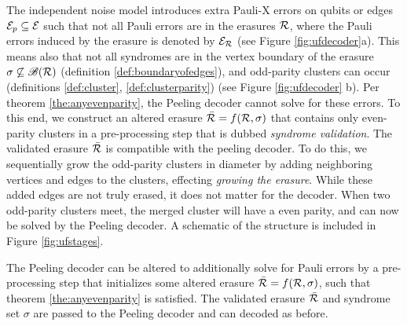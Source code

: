 The independent noise model introduces extra Pauli-X errors on qubits or edges $\mathcal{E}_p\subseteq \mathcal{E}$ such that not all Pauli errors are in the erasures $\mathcal{R}$, where the Pauli errors induced by the erasure is denoted by $\mathcal{E}_{\mathcal{R}}$ (see Figure \ref{fig:ufdecoder}a). This means also that not all syndromes are in the vertex boundary of the erasure $\sigma \not\subseteq \mathscr{B}(\mathcal{R})$ (definition \ref{def:boundaryofedges}), and odd-parity clusters can occur (definitions \ref{def:cluster}, \ref{def:clusterparity}) (see Figure \ref{fig:ufdecoder} b). Per theorem \ref{the:anyevenparity}, the Peeling decoder cannot solve for these errors. To this end, we construct an altered erasure $\bar{\mathcal{R}} = f(\mathcal{R},\sigma)$ that contains only even-parity clusters in a pre-processing step that is dubbed \emph{syndrome validation}. The validated erasure $\bar{\mathcal{R}}$ is compatible with the peeling decoder. To do this, we sequentially grow the odd-parity clusters in diameter by adding neighboring vertices and edges to the clusters, effecting \emph{growing the erasure}. While these added edges are not truly erased, it does not matter for the decoder. When two odd-parity clusters meet, the merged cluster will have a even parity, and can now be solved by the Peeling decoder. A schematic of the structure is included in Figure \ref{fig:ufstages}.
\begin{proposition}\label{prop:ufdecoder}
  The Peeling decoder can be altered to additionally solve for Pauli errors by a pre-processing step that initializes some altered erasure $\bar{\mathcal{R}}=f(\mathcal{R},\sigma)$, such that theorem \ref{the:anyevenparity} is satisfied. The validated erasure $\bar{\mathcal{R}}$ and syndrome set $\sigma$ are passed to the Peeling decoder and can decoded as before.
\end{proposition}
